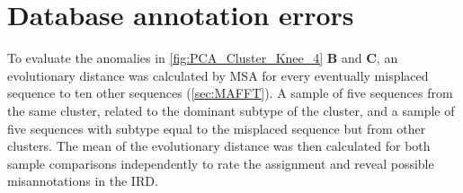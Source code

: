 \section{Database annotation errors} \label{sec:Clustering_Anomalies}

To evaluate the anomalies in \autoref{fig:PCA_Cluster_Knee_4} \textbf{\textsf{B}} and \textbf{\textsf{C}}, an evolutionary distance was calculated by \gls{MSA} for every eventually misplaced sequence to ten other sequences (\autoref{sec:MAFFT}). A sample of five sequences from the same cluster, related to the dominant subtype of the cluster, and a sample of five sequences with subtype equal to the misplaced sequence but from other clusters. The mean of the evolutionary distance was then calculated for both sample comparisons independently to rate the assignment and reveal possible misannotations in the \gls{IRD}. 

\begin{table}[!hbt]
    \centering
    \caption[Anomalies in segment 4 cluster 2 with PK]{\textbf{Anomalies in segment 4 cluster 2 with PK.} The \glspl{MSA} mean distance of the given sequences in comparison to a sample of H1 sequences of the same cluster and a sample of H10 sequences from other clusters was calculated.}
    \label{tab:PCA_Error_4_2}
\end{table}

